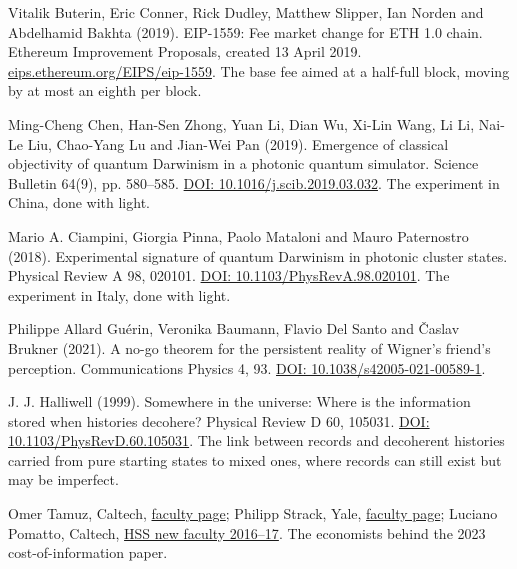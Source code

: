 \noindent Vitalik Buterin, Eric Conner, Rick Dudley, Matthew Slipper, Ian Norden and Abdelhamid Bakhta (2019). EIP-1559: Fee market change for ETH 1.0 chain. Ethereum Improvement Proposals, created 13 April 2019. \href{https://eips.ethereum.org/EIPS/eip-1559}{eips.ethereum.org/EIPS/eip-1559}. The base fee aimed at a half-full block, moving by at most an eighth per block.
\par\medskip

\noindent Ming-Cheng Chen, Han-Sen Zhong, Yuan Li, Dian Wu, Xi-Lin Wang, Li Li, Nai-Le Liu, Chao-Yang Lu and Jian-Wei Pan (2019). Emergence of classical objectivity of quantum Darwinism in a photonic quantum simulator. Science Bulletin 64(9), pp. 580--585. \href{https://doi.org/10.1016/j.scib.2019.03.032}{DOI: 10.1016/j.scib.2019.03.032}. The experiment in China, done with light.
\par\medskip

\noindent Mario A. Ciampini, Giorgia Pinna, Paolo Mataloni and Mauro Paternostro (2018). Experimental signature of quantum Darwinism in photonic cluster states. Physical Review A 98, 020101. \href{https://doi.org/10.1103/PhysRevA.98.020101}{DOI: 10.1103/PhysRevA.98.020101}. The experiment in Italy, done with light.
\par\medskip

\noindent Philippe Allard Gu\'erin, Veronika Baumann, Flavio Del Santo and \v{C}aslav Brukner (2021). A no-go theorem for the persistent reality of Wigner's friend's perception. Communications Physics 4, 93. \href{https://doi.org/10.1038/s42005-021-00589-1}{DOI: 10.1038/s42005-021-00589-1}.
\par\medskip

\noindent J. J. Halliwell (1999). Somewhere in the universe: Where is the information stored when histories decohere? Physical Review D 60, 105031. \href{https://doi.org/10.1103/PhysRevD.60.105031}{DOI: 10.1103/PhysRevD.60.105031}. The link between records and decoherent histories carried from pure starting states to mixed ones, where records can still exist but may be imperfect.
\par\medskip

\noindent Omer Tamuz, Caltech, \href{https://www.hss.caltech.edu/people/omer-tamuz}{faculty page}; Philipp Strack, Yale, \href{https://economics.yale.edu/people/philipp-strack}{faculty page}; Luciano Pomatto, Caltech, \href{https://hss.caltech.edu/documents/3303/HSS_New_Faces_2016-2017_FINAL.pdf}{HSS new faculty 2016--17}. The economists behind the 2023 cost-of-information paper.
\par\medskip


